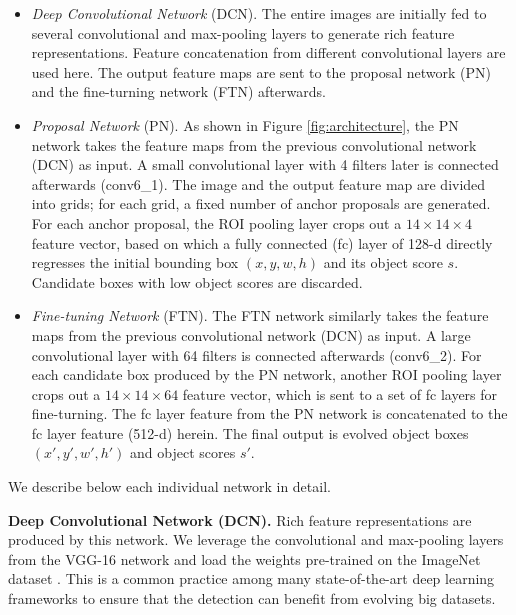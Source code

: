 \documentclass[5pt]{article}
\begin{document}
\begin{itemize}
\item \emph{Deep Convolutional Network} (DCN). The entire images are initially fed to several convolutional and max-pooling layers to generate rich feature representations. Feature concatenation from different convolutional layers are used here. The output feature maps are sent to the proposal network (PN) and the fine-turning network (FTN) afterwards.

\item \emph{Proposal Network} (PN). As shown in Figure \ref{fig:architecture}, the PN network takes the feature maps from the previous convolutional network (DCN) as input. A small convolutional layer with 4 filters later is connected afterwards (conv6\_1). The image and the output feature map are divided into grids; for each grid, a fixed number of anchor proposals are generated. For each anchor proposal, the ROI pooling layer crops out a $14\times14\times4$ feature vector, based on which a fully connected (fc) layer of 128-d directly regresses the initial bounding box $(x, y, w, h)$ and its object score $s$. Candidate boxes with low object scores are discarded.

\item \emph{Fine-tuning Network} (FTN). The FTN network similarly takes the feature maps from the previous convolutional network (DCN) as input. A large convolutional layer with 64 filters is connected afterwards (conv6\_2). For each candidate box produced by the PN network, another ROI pooling layer crops out a $14\times14\times64$ feature vector, which is sent to a set of fc layers for fine-turning. The fc layer feature from the PN network is concatenated to the fc layer feature (512-d) herein. The final output is evolved object boxes $(x', y', w', h')$ and object scores $s'$.

\end{itemize}

We describe below each individual network in detail.

\vspace{0.08in}
\noindent\textbf{Deep Convolutional Network (DCN).} Rich feature representations are produced by this network. We leverage the convolutional and max-pooling layers from the VGG-16 \cite{simonyan2014very} network and load the weights pre-trained on the ImageNet dataset \cite{deng2009imagenet}. This is a common practice among many state-of-the-art deep learning frameworks \cite{redmon2015you,renNIPS15fasterrcnn} to ensure that the detection can benefit from evolving big datasets.
\end{document}
